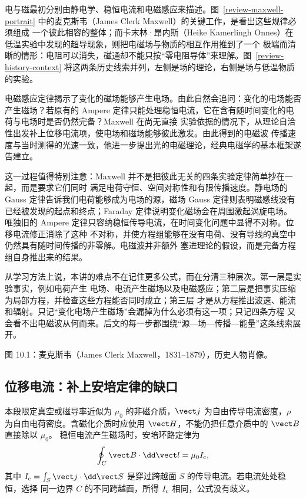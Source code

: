 电与磁最初分别由静电学、稳恒电流和电磁感应来描述。图~\ref{review-maxwell-portrait} 中的麦克斯韦（James Clerk Maxwell）的关键工作，是看出这些规律必须组成
一个彼此相容的整体；而卡末林·昂内斯（Heike Kamerlingh Onnes）在低温实验中发现的超导现象，则把电磁场与物质的相互作用推到了一个
极端而清晰的情形：电阻可以消失，磁通却不能只按“零电阻导体”来理解。图~\ref{review-history-context} 将这两条历史线索并列，左侧是场的理论，右侧是场与低温物质的实验。

电磁感应定律揭示了变化的磁场能够产生电场。由此自然会追问：变化的电场能否产生磁场？若原有的
Ampere 定律只能处理稳恒电流，它在含有随时间变化的电荷与电场时是否仍然完备？Maxwell 在尚无直接
实验依据的情况下，从理论自洽性出发补上位移电流项，使电场和磁场能够彼此激发。由此得到的电磁波
传播速度与当时测得的光速一致，他进一步提出光的电磁理论，经典电磁学的基本框架遂告建立。

这一过程值得特别注意：Maxwell 并不是把彼此无关的四条实验定律简单抄在一起，而是要求它们同时
满足电荷守恒、空间对称性和有限传播速度。静电场的 Gauss 定律告诉我们电荷能够成为电场的源，磁场
Gauss 定律则表明磁感线没有已经被发现的起点和终点；Faraday 定律说明变化磁场会在周围激起涡旋电场。
唯独旧的 Ampere 定律只容纳稳恒传导电流，在时间变化问题中显得不对称。位移电流修正消除了这种
不对称，并使方程组能够在没有电荷、没有导线的真空中仍然具有随时间传播的非零解。电磁波并非额外
塞进理论的假设，而是完备方程组自身推出来的结果。

从学习方法上说，本讲的难点不在记住更多公式，而在分清三种层次。第一层是实验事实，例如电荷产生
电场、电流产生磁场以及电磁感应；第二层是把事实压缩为局部方程，并检查这些方程能否同时成立；第三层
才是从方程推出波速、能流和辐射。只记“变化电场产生磁场”会漏掉为什么必须有这一项；只记四条方程
又会看不出电磁波从何而来。后文的每一步都围绕“源—场—传播—能量”这条线索展开。

\maxwellOnnesContext

%
{图 10.1：麦克斯韦（James Clerk Maxwell，1831--1879），历史人物肖像。\label{review-maxwell-portrait}}

\subsection{位移电流：补上安培定律的缺口}

本段限定真空或磁导率近似为 $\mu_0$ 的非磁介质，$\vect j$ 为自由传导电流密度，$\rho$ 为自由电荷密度。含磁化介质时应使用 $\vect H$，不能仍把任意介质中的 $\vect B$ 直接除以 $\mu_0$。
稳恒电流产生磁场时，安培环路定律为
\begin{equation}
  \oint_C\vect B\cdot\dd\vect l=\mu_0 I_{\rm c},
\end{equation}
其中 $I_{\rm c}=\int_S\vect j\cdot\dd\vect S$ 是穿过跨越面 $S$ 的传导电流。若电流处处稳恒，选择
同一边界 $C$ 的不同跨越面，所得 $I_{\rm c}$ 相同，公式没有歧义。

